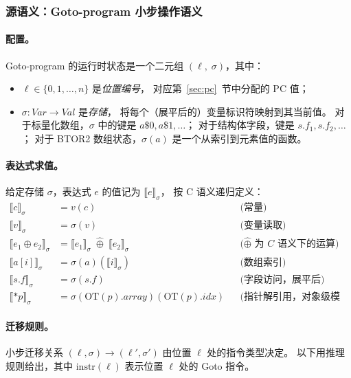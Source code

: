 \documentclass[11pt,a4paper]{article}
\begin{document}
\subsubsection{源语义：Goto-program 小步操作语义}
\label{sec:source-sem}

\paragraph{配置。}
Goto-program 的运行时状态是一个二元组 $(\ell,\; \sigma)$，其中：
\begin{itemize}
\item $\ell \in \{0, 1, \ldots, n\}$ 是\emph{位置编号}，
对应第~\ref{sec:pc}~节中分配的 PC 值；
\item $\sigma : \mathit{Var} \to \mathit{Val}$ 是\emph{存储}，
将每个（展平后的）变量标识符映射到其当前值。
对于标量化数组，$\sigma$ 中的键是 $a\$0, a\$1, \ldots$；
对于结构体字段，键是 $s.f_1, s.f_2, \ldots$；
对于 BTOR2 数组状态，$\sigma(a)$ 是一个从索引到元素值的函数。
\end{itemize}

\paragraph{表达式求值。}
给定存储 $\sigma$，表达式 $e$ 的值记为 $\llbracket e \rrbracket_\sigma$，
按 C 语义递归定义：
\begin{align*}
\llbracket c \rrbracket_\sigma &= v(c)
  && \textit{(常量)} \\
\llbracket v \rrbracket_\sigma &= \sigma(v)
  && \textit{(变量读取)} \\
\llbracket e_1 \oplus e_2 \rrbracket_\sigma
  &= \llbracket e_1 \rrbracket_\sigma \;\hat\oplus\; \llbracket e_2 \rrbracket_\sigma
  && \textit{($\hat\oplus$ 为 C 语义下的运算)} \\
\llbracket a[i] \rrbracket_\sigma &= \sigma(a)(\llbracket i \rrbracket_\sigma)
  && \textit{(数组索引)} \\
\llbracket s.f \rrbracket_\sigma &= \sigma(s.f)
  && \textit{(字段访问，展平后)} \\
\llbracket *p \rrbracket_\sigma &= \sigma(\mathrm{OT}(p).\mathit{array})(\mathrm{OT}(p).\mathit{idx})
  && \textit{(指针解引用，对象级模型)}
\end{align*}

\paragraph{迁移规则。}
小步迁移关系 $(\ell, \sigma) \to (\ell', \sigma')$ 由位置 $\ell$ 处的指令类型决定。
以下用推理规则给出，其中 $\mathrm{instr}(\ell)$ 表示位置 $\ell$ 处的 Goto 指令。
\end{document}
